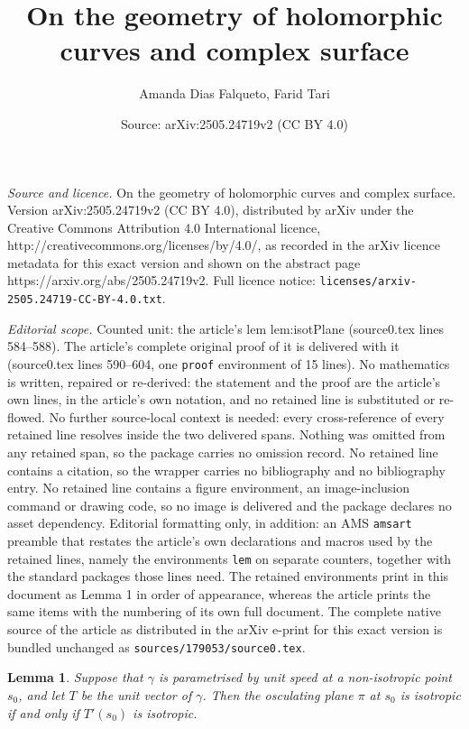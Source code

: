 \documentclass[10pt,a4paper]{amsart}
\title{On the geometry of holomorphic curves and complex surface}
\author{Amanda Dias Falqueto, Farid Tari}
\date{Source: arXiv:2505.24719v2 (CC BY 4.0)}
\newtheorem{lem}{Lemma}
\begin{document}
\maketitle

\noindent\emph{Source and licence.} On the geometry of holomorphic curves and complex surface. Version arXiv:2505.24719v2 (CC BY 4.0), distributed by arXiv under the Creative Commons Attribution 4.0 International licence, http://creativecommons.org/licenses/by/4.0/, as recorded in the arXiv licence metadata for this exact version and shown on the abstract page https://arxiv.org/abs/2505.24719v2. Full licence notice: \texttt{licenses/arxiv-2505.24719-CC-BY-4.0.txt}.\par\smallskip

\noindent\textit{Editorial scope.} Counted unit: the article's lem lem:isotPlane (source0.tex lines 584--588). The article's complete original proof of it is delivered with it (source0.tex lines 590--604, one \texttt{proof} environment of 15 lines). No mathematics is written, repaired or re-derived: the statement and the proof are the article's own lines, in the article's own notation, and no retained line is substituted or re-flowed.  No further source-local context is needed: every cross-reference of every retained line resolves inside the two delivered spans.  Nothing was omitted from any retained span, so the package carries no omission record.  No retained line contains a citation, so the wrapper carries no bibliography and no bibliography entry.  No retained line contains a figure environment, an image-inclusion command or drawing code, so no image is delivered and the package declares no asset dependency.  Editorial formatting only, in addition: an AMS \texttt{amsart} preamble that restates the article's own declarations and macros used by the retained lines, namely the environments \texttt{lem} on separate counters, together with the standard packages those lines need.  The retained environments print in this document as Lemma 1 in order of appearance, whereas the article prints the same items with the numbering of its own full document.  The complete native source of the article as distributed in the arXiv e-print for this exact version is bundled unchanged as \texttt{sources/179053/source0.tex}.
\begin{lem}\label{lem:isotPlane}
Suppose that $\gamma$ is parametrised by unit speed at a non-isotropic point $s_0$, and let $T$ be the unit vector of $\gamma$. 
Then the osculating plane $\pi$ at $s_0$ is isotropic 
if and only if $T'(s_0)$ is isotropic.
\end{lem}
\end{document}
